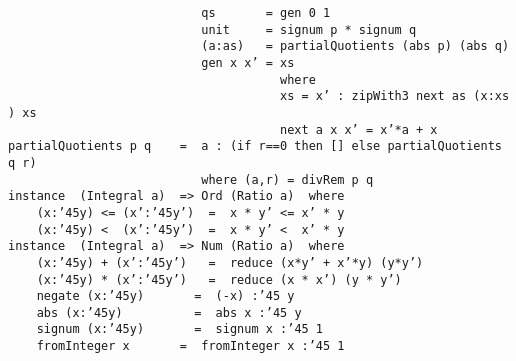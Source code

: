 {{{\mbox{\tt \ \ \ \ \ \ \ \ \ \ \ \ \ \ \ \ \ \ \ \ \ \ \ \ \ \ \ qs\ \ \ \ \ \ \ =\ gen\ 0\ 1}\\
\mbox{\tt \ \ \ \ \ \ \ \ \ \ \ \ \ \ \ \ \ \ \ \ \ \ \ \ \ \ \ unit\ \ \ \ \ =\ signum\ p\ *\ signum\ q}\\
\mbox{\tt \ \ \ \ \ \ \ \ \ \ \ \ \ \ \ \ \ \ \ \ \ \ \ \ \ \ \ (a:as)\ \ \ =\ partialQuotients\ (abs\ p)\ (abs\ q)}\\
\mbox{\tt \ \ \ \ \ \ \ \ \ \ \ \ \ \ \ \ \ \ \ \ \ \ \ \ \ \ \ gen\ x\ x'\ =\ xs}\\
\mbox{\tt \ \ \ \ \ \ \ \ \ \ \ \ \ \ \ \ \ \ \ \ \ \ \ \ \ \ \ \ \ \ \ \ \ \ \ \ \ \ where}\\
\mbox{\tt \ \ \ \ \ \ \ \ \ \ \ \ \ \ \ \ \ \ \ \ \ \ \ \ \ \ \ \ \ \ \ \ \ \ \ \ \ \ xs\ =\ x'\ :\ zipWith3\ next\ as\ (x:xs)\ xs}\\
\mbox{\tt \ \ \ \ \ \ \ \ \ \ \ \ \ \ \ \ \ \ \ \ \ \ \ \ \ \ \ \ \ \ \ \ \ \ \ \ \ \ next\ a\ x\ x'\ =\ x'*a\ +\ x}
\eprogB\noindent\bprogB
\mbox{\tt partialQuotients\ p\ q\ \ \ \ =\ \ a\ :\ (if\ r==0\ then\ []\ else\ partialQuotients\ q\ r)}\\
\mbox{\tt \ \ \ \ \ \ \ \ \ \ \ \ \ \ \ \ \ \ \ \ \ \ \ \ \ \ \ where\ (a,r)\ =\ divRem\ p\ q}
\eprogB\noindent\bprogB
\mbox{\tt instance\ \ (Integral\ a)\ \ =>\ Ord\ (Ratio\ a)\ \ where}\\
\mbox{\tt \ \ \ \ (x:{\char'45}y)\ <=\ (x':{\char'45}y')\ \ =\ \ x\ *\ y'\ <=\ x'\ *\ y}\\
\mbox{\tt \ \ \ \ (x:{\char'45}y)\ <\ \ (x':{\char'45}y')\ \ =\ \ x\ *\ y'\ <\ \ x'\ *\ y}
%
\eprogB\noindent\bprogB
\mbox{\tt instance\ \ (Integral\ a)\ \ =>\ Num\ (Ratio\ a)\ \ where}\\
\mbox{\tt \ \ \ \ (x:{\char'45}y)\ +\ (x':{\char'45}y')\ \ \ =\ \ reduce\ (x*y'\ +\ x'*y)\ (y*y')}\\
\mbox{\tt \ \ \ \ (x:{\char'45}y)\ *\ (x':{\char'45}y')\ \ \ =\ \ reduce\ (x\ *\ x')\ (y\ *\ y')}\\
\mbox{\tt \ \ \ \ negate\ (x:{\char'45}y)\ \ \ \ \ \ \ =\ \ (-x)\ :{\char'45}\ y}\\
\mbox{\tt \ \ \ \ abs\ (x:{\char'45}y)\ \ \ \ \ \ \ \ \ \ =\ \ abs\ x\ :{\char'45}\ y}\\
\mbox{\tt \ \ \ \ signum\ (x:{\char'45}y)\ \ \ \ \ \ \ =\ \ signum\ x\ :{\char'45}\ 1}\\
\mbox{\tt \ \ \ \ fromInteger\ x\ \ \ \ \ \ \ =\ \ fromInteger\ x\ :{\char'45}\ 1}
%
\eprogB\noindent\bprogB
}}}
